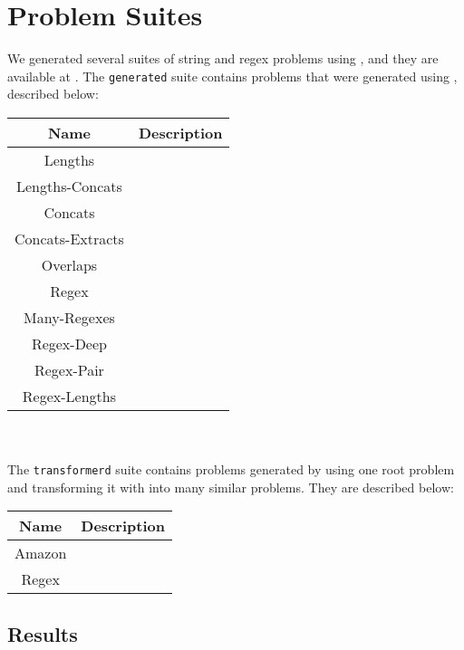 \section{Problem Suites}

    We generated several suites of string and regex problems using \fuzzer{}, and they are available at \problemRepo{}. The \texttt{generated} suite contains problems that were generated using \generator{}, described below:


    \begin{tabular}{|c|c|}
        \hline
        \textbf{Name}    & \textbf{Description} \\ \hline
        Lengths          & \\ \hline
        Lengths-Concats  & \\ \hline
        Concats          & \\ \hline
        Concats-Extracts & \\ \hline
        Overlaps         & \\ \hline
        Regex            & \\ \hline
        Many-Regexes     & \\ \hline
        Regex-Deep       & \\ \hline
        Regex-Pair       & \\ \hline
        Regex-Lengths    & \\ \hline
    \end{tabular}
    \hfill \\ \\

    The \texttt{transformerd} suite contains problems generated by using one root problem and transforming it with \transformer{} into many similar problems. They are described below:


    \begin{tabular}{|c|c|}
        \hline
        \textbf{Name} & \textbf{Description} \\ \hline
        Amazon        & \\ \hline
        Regex         & \\ \hline
    \end{tabular}

    \subsection{Results}

